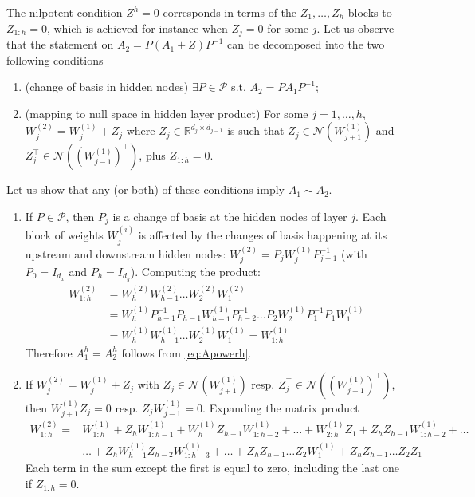 \documentclass{article}
\makeatletter
\renewenvironment{proof}[1][\proofname]{
  \par\pushQED{\qed}\normalfont
  \topsep6\p@\@plus6\p@\relax
  \trivlist\item[\hskip\labelsep\bfseries#1\@addpunct{.}]
  \ignorespaces
}{
  \popQED\endtrivlist\@endpefalse
}
\newcommand{\1}{\mathds{1}}
\newcommand{\benu}{\begin{enumerate}}
\newcommand{\eenu}{\end{enumerate}}
\makeatother
\begin{document}
\begin{proof}
The nilpotent condition $ Z^h=0 $ corresponds in terms of the $ Z_1, \ldots, Z_h $ blocks to $ Z_{1:h}=0$, which is achieved for instance when $ Z_j =0$ for some $j$.  
Let us observe that the statement on $ A_2 = P (A_1 + Z ) P^{-1} $ can be decomposed into the two following conditions
\benu
\item (change of basis in hidden nodes) $ \exists P \in \mathcal{P} $ s.t. $ A_2 = P A_1 P^{-1}$;
\item (mapping to null space in hidden layer product) For some $ j=1,\ldots, h$, $ W_j^{(2)} = W_j^{(1)} + Z_j $ where  $ Z_j \in \mathbb{R}^{d_j \times d_{j-1}} $ is such that $ Z_j \in \mathcal{N}(W_{j+1}^{(1)}) $ and $ Z_j^\top \in \mathcal{N}((W_{j-1}^{(1)})^\top) $, plus $ Z_{1:h}=0$.
\eenu

Let us show that any (or both) of these conditions imply $ A_1 \sim A_2 $.
\benu
\item If $ P \in \mathcal{P}$, then $ P_j $ is a change of basis at the hidden nodes of layer $ j$.
 Each block of weights $ W_j^{(i)} $ is affected by the changes of basis happening at its upstream and downstream hidden nodes: $ W_j^{(2)} = P_j W_j^{(1)} P_{j-1}^{-1}$ (with $ P_0=I_{d_x} $ and $ P_h=I_{d_y} $). 
Computing the product:
\begin{align*}
W_{1:h}^{(2)} & = W_h^{(2)} W_{h-1}^{(2)} \ldots  W_2^{(2)} W_1^{(2)} \\
& = W_h^{(1)} P_{h-1}^{-1} P_{h-1} W_{h-1}^{(1)} P_{h-2}^{-1} \ldots  P_2 W_2^{(1)} P_1^{-1} P_1  W_1^{(1)} \\
& = W_h^{(1)} W_{h-1}^{(1)} \ldots  W_2^{(1)} W_1^{(1)} = W_{1:h}^{(1)} 
\end{align*}
Therefore $ A_1^h = A_2^h$ follows from \eqref{eq:Apowerh}.
\item If $ W_j^{(2)} = W_j^{(1)} + Z_j $ with $ Z_j \in \mathcal{N}(W_{j+1}^{(1)}) $ resp. $ Z_j^\top \in \mathcal{N}((W_{j-1}^{(1)})^\top) $, then  $  W_{j+1}^{(1)} Z_j =0 $ resp.  $  Z_j W_{j-1}^{(1)}  =0 $. Expanding the matrix product
\[
\begin{split}
W_{1:h}^{(2)}  = & W_{1:h}^{(1)} + Z_h W_{1:h-1}^{(1)} + W_h^{(1)} Z_{h-1} W_{1:h-2}^{(1)} + \ldots + W_{2:h}^{(1)}Z_1 + Z_h Z_{h-1} W_{1:h-2}^{(1)} + \ldots \\ & \ldots +Z_h W_{h-1}^{(1)} Z_{h-2} W_{1:h-3}^{(1)} + \ldots + 
Z_h Z_{h-1} \ldots Z_2 W_1^{(1)} + Z_h Z_{h-1} \ldots Z_2 Z_1 
\end{split}
\]
Each term in the sum except the first is equal to zero, including the last one if $ Z_{1:h}=0 $.
\eenu
\end{proof}
\end{document}
